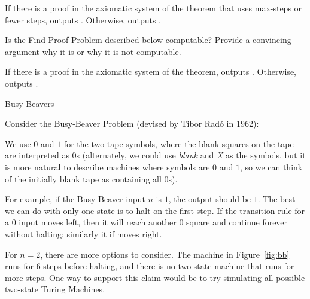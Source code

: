 \begin{schemeregion}
\begin{exercise}
{If there is a proof in the axiomatic system of the theorem that uses max-steps or fewer steps, outputs \True.  Otherwise, outputs \False.}
\solution{\LATER{}}
\end{exercise}
\aftersplitex

\beforeex
\begin{exercise}\goldstar
Is the Find-Proof Problem described below computable?   Provide a convincing argument why it is or why it is not computable.

{If there is a proof in the axiomatic system of the theorem, outputs \True.  Otherwise, outputs \False.}
\solution{\LATER{}}
\end{exercise}
\afterex


\begin{exploration}{Busy Beavers}\vspace*{0.5ex}\par

Consider the Busy-Beaver Problem (devised by Tibor Rad\'{o} in 1962):


We use $0$ and $1$ for the two tape symbols, where the blank squares on the tape are interpreted as $0$s (alternately, we could use \emph{blank} and \emph{X} as the symbols, but it is more natural to describe machines where symbols are $0$ and $1$, so we can think of the initially blank tape as containing all $0$s).

For example, if the Busy Beaver input $n$ is $1$, the output should be $1$.  The best we can do with only one state is to halt on the first step.  If the transition rule for a $0$ input moves left, then it will reach another $0$ square and continue forever without halting; similarly it if moves right.   

For $n = 2$, there are more options to consider.  The machine in Figure~\ref{fig:bb} runs for 6 steps before halting, and there is no two-state machine that runs for more steps.  One way to support this claim would be to try simulating all possible two-state Turing Machines.  


\end{exploration}
\end{schemeregion}
